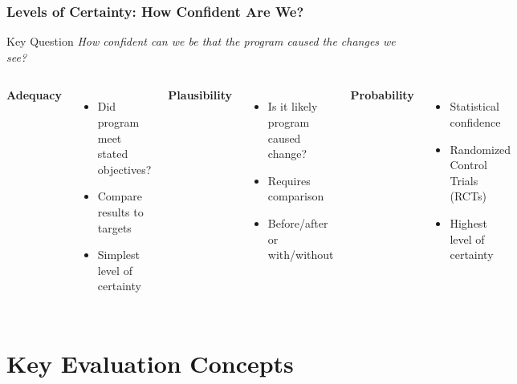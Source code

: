 \documentclass{beamer}
\begin{document}
\begin{frame}
\frametitle{Levels of Certainty: How Confident Are We?}

{
\begin{block}{Key Question}
\textit{How confident can we be that the program caused the changes we see?}
\end{block}}

\vspace{0.2cm}
\begin{columns}[t] %
\textbf{Adequacy}
\begin{itemize}[itemsep=0.2em] %
    \item Did program meet stated objectives?
    \item Compare results to targets
    \item Simplest level of certainty
\end{itemize}

\textbf{Plausibility}
\begin{itemize}[itemsep=0.2em] %
    \item Is it likely program caused change?
    \item Requires comparison
    \item Before/after or with/without
\end{itemize}

\textbf{Probability}
\begin{itemize}[itemsep=0.2em] %
    \item Statistical confidence
    \item Randomized Control Trials (RCTs)
    \item Highest level of certainty
\end{itemize}
\end{columns}
\end{frame}

\section{Key Evaluation Concepts}
\end{document}

